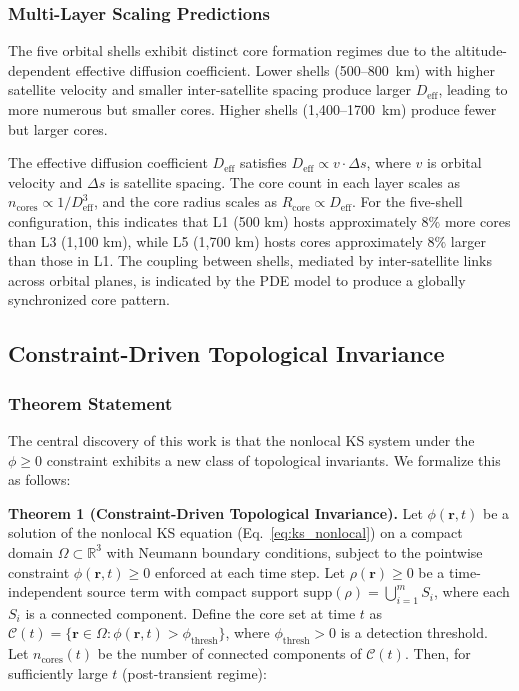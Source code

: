\documentclass[sn-nature,pdflatex]{sn-jnl}
\begin{document}
\subsubsection{Multi-Layer Scaling Predictions}

The five orbital shells exhibit distinct core formation regimes due to the altitude-dependent effective diffusion coefficient.
Lower shells (500--\SI{800}{\km}) with higher satellite velocity and smaller inter-satellite spacing produce larger $D_{\text{eff}}$, leading to more numerous but smaller cores.
Higher shells (1,400--\SI{1700}{\km}) produce fewer but larger cores.

The effective diffusion coefficient $D_{\text{eff}}$ satisfies $D_{\text{eff}} \propto v \cdot \Delta s$, where $v$ is orbital velocity and $\Delta s$ is satellite spacing.
The core count in each layer scales as $n_{\text{cores}} \propto 1/D_{\text{eff}}^3$, and the core radius scales as $R_{\text{core}} \propto D_{\text{eff}}$.
For the five-shell configuration, this indicates that L1 (500 km) hosts approximately $8\%$ more cores than L3 (1,100 km), while L5 (1,700 km) hosts cores approximately $8\%$ larger than those in L1.
The coupling between shells, mediated by inter-satellite links across orbital planes, is indicated by the PDE model to produce a globally synchronized core pattern.

\subsection{Constraint-Driven Topological Invariance}
\label{sec:topological_invariance}

\subsubsection{Theorem Statement}

The central discovery of this work is that the nonlocal KS system under the $\phi \ge 0$ constraint exhibits a new class of topological invariants.
We formalize this as follows:

\medskip
\noindent\textbf{Theorem 1 (Constraint-Driven Topological Invariance).}
Let $\phi(\mathbf{r}, t)$ be a solution of the nonlocal KS equation (Eq.~\ref{eq:ks_nonlocal}) on a compact domain $\Omega \subset \mathbb{R}^3$ with Neumann boundary conditions, subject to the pointwise constraint $\phi(\mathbf{r}, t) \ge 0$ enforced at each time step.
Let $\rho(\mathbf{r}) \ge 0$ be a time-independent source term with compact support $\text{supp}(\rho) = \bigcup_{i=1}^{m} S_i$, where each $S_i$ is a connected component.
Define the core set at time $t$ as $\mathcal{C}(t) = \{\mathbf{r} \in \Omega : \phi(\mathbf{r}, t) > \phi_{\text{thresh}}\}$, where $\phi_{\text{thresh}} > 0$ is a detection threshold.
Let $n_{\text{cores}}(t)$ be the number of connected components of $\mathcal{C}(t)$.
Then, for sufficiently large $t$ (post-transient regime):
\end{document}

